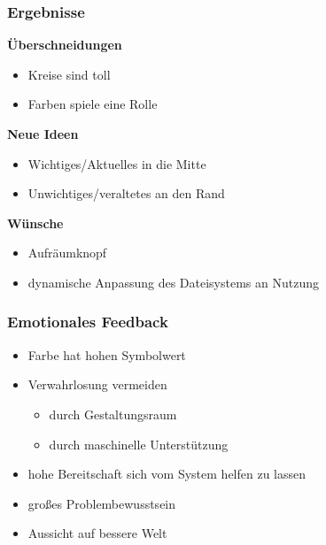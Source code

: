 \begin{frame}

\frametitle{Ergebnisse}
\label{ergebnisse}

\textbf{Überschneidungen}

\begin{itemize}
\item Kreise sind toll

\item Farben spiele eine Rolle

\end{itemize}

\textbf{Neue Ideen}

\begin{itemize}
\item Wichtiges\slash Aktuelles in die Mitte

\item Unwichtiges\slash veraltetes an den Rand

\end{itemize}

\textbf{Wünsche}

\begin{itemize}
\item Aufräumknopf

\item dynamische Anpassung des Dateisystems an Nutzung

\end{itemize}

\end{frame}

\begin{frame}

\frametitle{Emotionales Feedback}
\label{emotionalesfeedback}

\begin{itemize}
\item Farbe hat hohen Symbolwert

\item Verwahrlosung vermeiden

\begin{itemize}
\item durch Gestaltungsraum

\item durch maschinelle Unterstützung

\end{itemize}

\item hohe Bereitschaft sich vom System helfen zu lassen

\item großes Problembewusstsein

\item Aussicht auf bessere Welt

\end{itemize}

\end{frame}


